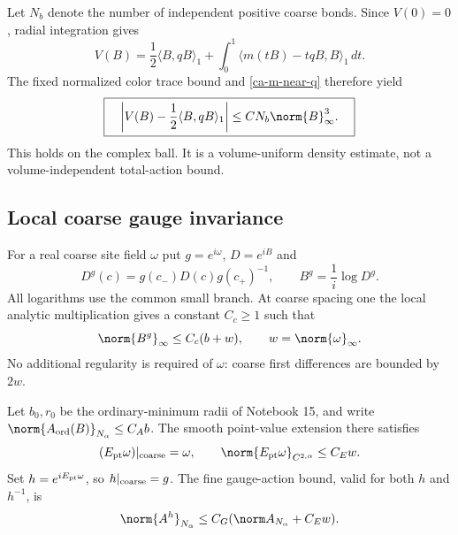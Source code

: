 Let $N_b$ denote the number of independent positive coarse
bonds. Since $V(0)=0$, radial integration gives
\begin{equation}\label{ca-radial}
 V(B)=\frac12\langle B,qB\rangle_1
       +\int_0^1\langle m(tB)-tqB,B\rangle_1\,dt.
\end{equation}
The fixed normalized color trace bound and
\eqref{ca-m-near-q} therefore yield
\begin{equation}\label{ca-cubic-remainder}
 \boxed{\quad
 \left|V(B)-\frac12\langle B,qB\rangle_1\right|
          \le C N_b\norm{B}_\infty^3.
 \quad}
\end{equation}
This holds on the complex ball. It is a volume-uniform
density estimate, not a volume-independent total-action bound.

\subsection{Local coarse gauge invariance}
\label{ca-gauge-section}

For a real coarse site field $\omega$ put $g=e^{i\omega}$,
$D=e^{iB}$ and
\begin{equation}\label{ca-coarse-gauge}
 D^g(c)=g(c_-)D(c)g(c_+)^{-1},\qquad
 B^g=\frac1i\log D^g.
\end{equation}
All logarithms use the common small branch. At coarse spacing
one the local analytic multiplication gives a constant
$C_c\ge1$ such that
\begin{equation}\label{ca-coarse-gauge-bound}
 \norm{B^g}_\infty\le C_c(b+w),\qquad
 w=\norm{\omega}_\infty.
\end{equation}
No additional regularity is required of $\omega$: coarse
first differences are bounded by $2w$.

Let $b_0,r_0$ be the ordinary-minimum radii of Notebook 15,
and write
$\norm{A_{\rm ord}(B)}_{N_\alpha}\le C_Ab$.
The smooth point-value extension there satisfies
\begin{equation}\label{ca-smooth-gauge-lift}
 (E_{\rm pt}\omega)|_{\rm coarse}=\omega,\qquad
 \norm{E_{\rm pt}\omega}_{C^{2,\alpha}}\le C_Ew.
\end{equation}
Set $h=e^{iE_{\rm pt}\omega}$, so $h|_{\rm coarse}=g$.
The fine gauge-action bound, valid for both $h$ and $h^{-1}$,
is
\begin{equation}\label{ca-fine-gauge-bound}
 \norm{A^h}_{N_\alpha}
       \le C_G(\norm A_{N_\alpha}+C_Ew).
\end{equation}

